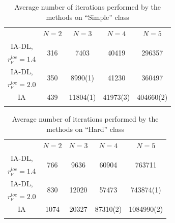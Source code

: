 \documentclass[twocolumn]{svjour3}          %
\begin{document}
\begin{table}[h!]
	\caption{Average number of iterations performed by the methods on “Simple” class}
	\label{tab:average_number_of_iterations_simple}
	\begin{tabular}[]{ccccc}
		\hline\noalign{\smallskip}
		                    & $N=2$                & $N=3$                    & $N=4$                  & $N=5$                   \\
		\noalign{\smallskip}\hline\noalign{\smallskip}
		IA-DL,              & \multirow{2}{*}{316} & \multirow{2}{*}{7403}    & \multirow{2}{*}{40419} & \multirow{2}{*}{296357} \\
		$r_{\nu}^{loc}=1.4$ &                      &                          &                        &                         \\
		\noalign{\smallskip}
		IA-DL,              & \multirow{2}{*}{350} & \multirow{2}{*}{8990(1)} & \multirow{2}{*}{41230} & \multirow{2}{*}{360497} \\
		$r_{\nu}^{loc}=2.0$ &                      &                          &                        &                         \\
		\noalign{\smallskip}
		IA                  & 439                  & 11804(1)                 & 41973(3)               & 404660(2)               \\
		\hline\noalign{\smallskip}
	\end{tabular}
\end{table}

\begin{table}[h!]
	\caption{Average number of iterations performed by the methods on “Hard” class}
	\label{tab:average_number_of_iterations_hard}
	\begin{tabular}{ccccc}
		\hline\noalign{\smallskip}
		                    & $N=2$                & $N=3$                    & $N=4$                  & $N=5$                      \\
		\noalign{\smallskip}\hline\noalign{\smallskip}
		IA-DL,              & \multirow{2}{*}{766} & \multirow{2}{*}{9636}    & \multirow{2}{*}{60904} & \multirow{2}{*}{763711}    \\
		$r_{\nu}^{loc}=1.4$ &                      &                          &                        &                            \\
		\noalign{\smallskip}
		IA-DL,              & \multirow{2}{*}{830} & \multirow{2}{*}{12020}   & \multirow{2}{*}{57473} & \multirow{2}{*}{743874(1)} \\
		$r_{\nu}^{loc}=2.0$ &                      &                          &                        &                            \\
		\noalign{\smallskip}
		IA                  & 1074                 & 20327                    & 87310(2)               & 1084990(2)                 \\
		\hline\noalign{\smallskip}
	\end{tabular}
\end{table}
\end{document}
